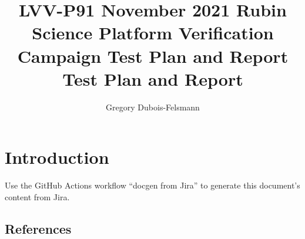 \documentclass[DM,lsstdraft,toc]{lsstdoc}
\begin{document}
\def\milestoneName{November 2021 Rubin Science Platform Verification Campaign Test Plan and Report}
\def\milestoneId{LVV-P91}
\def\product{Data Management}


\title{LVV-P91 November 2021 Rubin Science Platform Verification Campaign Test Plan and Report Test Plan and Report}
\setDocRef{\lsstDocType-\lsstDocNum}
\date{\vcsDate}
\author{Gregory Dubois-Felsmann}




\maketitle

\section{Introduction}
Use the GitHub Actions workflow ``docgen from Jira'' to generate this document's content from Jira.

\subsection{References}
\label{sect:references}
\renewcommand{\refname}{}




\end{document}
